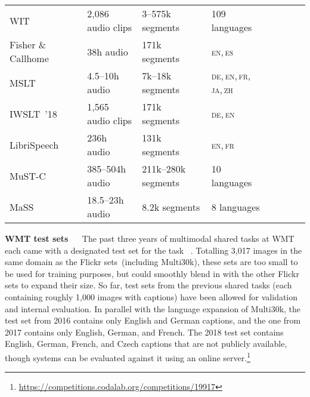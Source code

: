 \documentclass{svjour3}
\newcommand{\element}[1]{\noindent\textbf{#1} ~~}
\newcommand{\tedtrans}{IWSLT~’18}
\newcommand{\tick}{\checkmark}
\begin{document}
\begin{table}[t]
\begin{tabular}{@{}llllcccc@{}}
WIT~\citep{cettolo-wit3:-2012}                     & 2,086 audio clips   & 3--575k segments    & 109 languages                   & \tick & & \\
            Fisher \& Callhome~\citep{post-improved-2013}          & 38h audio      & 171k segments       & \textsc{en,\,es}                & \tick & & \\
            MSLT~\citep{federmann-microsoft-2017}                  & 4.5--10h audio & 7k--18k segments    & \textsc{de,\,en,\,fr,\,ja,\,zh} & \tick & & \\
            \tedtrans{}~\citep{niehues-iwslt-2018}                 & 1,565 audio clips   & 171k segments       & \textsc{de,\,en}                & \tick & & \\
            LibriSpeech~\citep{kocabiyikoglu-librispeech-slt-2018} & 236h audio     & 131k segments       & \textsc{en,\,fr}                & \tick & & \\
            MuST-C~\citep{gangi-mustc-2019}                        & 385--504h audio    & 211k--280k segments & 10 languages                    & \tick & & \\
            MaSS~\citep{boito-mass-2019}                           & 18.5--23h audio     & 8.2k segments       & 8 languages                     & \tick & & \\
            


\bottomrule
        \end{tabular}
    \end{table}
    
  












        \element{WMT test sets}
            The past three years of multimodal shared tasks at WMT each came with a designated test set for the task ~\citep{specia-shared-2016, elliott-findings-2017, barrault-findings-2018}. Totalling 3,017 images in the same domain as the Flickr sets~(including Multi30k), these sets are too small to be used for training purposes, but could smoothly blend in with the other Flickr sets to expand their size. So far, test sets from the previous shared tasks (each containing roughly 1,000 images with captions) have been allowed for validation and internal evaluation. In parallel with the language expansion of Multi30k, the test set from 2016 contains only English and German captions, and the one from 2017 contains only English, German, and French. The 2018 test set contains English, German, French, and Czech captions that are not publicly available, though systems can be evaluated against it using an online server.\footnote{\url{https://competitions.codalab.org/competitions/19917}}\\
        
\end{document}

